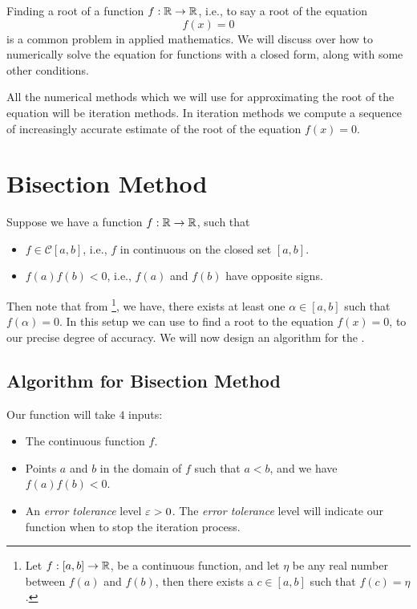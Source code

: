 
Finding a root of a function $f : \mathbb{R} \to \mathbb{R}$, i.e., to say a root of the equation 
\[
    f(x) = 0  
\]
is a common problem in applied mathematics. We will discuss over how to numerically solve the equation for functions with a closed form, along with some other conditions. 


All the numerical methods which we will use for approximating the root of the equation will be iteration methods. In iteration methods we compute a sequence of increasingly accurate estimate of the root of the equation $f(x) = 0$.

\section{Bisection Method}

Suppose we have a function $f : \mathbb{R} \to \mathbb{R}$, such that \begin{itemize}
    \item $f \in \mathcal{C}[a,b]$, i.e., $f$ in continuous on the closed set $[a,b]$. 
    \item $f(a)f(b) < 0$, i.e., $f(a)$ and $f(b)$ have opposite signs.  
\end{itemize}
Then note that from \footnote{ Let $f : [a,b] \to \mathbb{R}$, be a continuous function, and let $\eta$ be any real number between $f(a)$ and $f(b)$, then there exists a $c \in [a,b]$ such that $f(c) = \eta$.}, we have, there exists at least one $\alpha \in [a,b]$ such that $f(\alpha) = 0$. In this setup we can use  to find a root to the equation $f(x) = 0$, to our precise degree of accuracy. We will now design an algorithm for the .  

\subsection{Algorithm for Bisection Method}

Our function will take $4$ inputs: 
\begin{itemize}
    \item The continuous function $f$.
    \item Points $a$ and $b$ in the domain of $f$ such that $a < b$, and we have $f(a) f(b) < 0$.
    \item An \textit{error tolerance} level $\varepsilon > 0$. The \textit{error tolerance} level will indicate our function when to stop the iteration process. 
\end{itemize}

